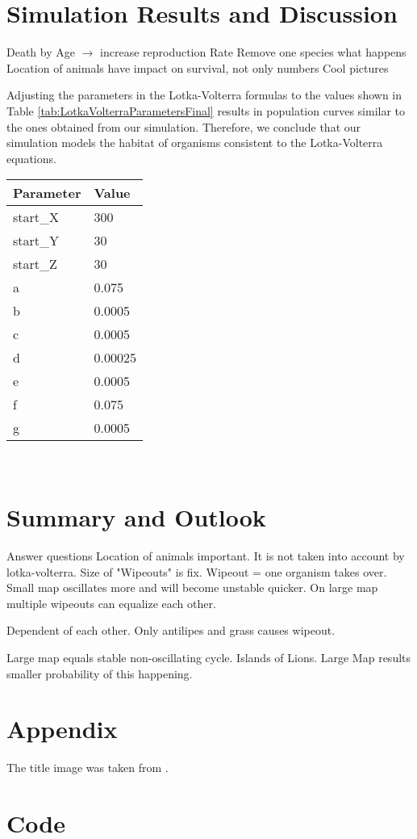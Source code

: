 \documentclass[11pt]{article}
\begin{document}

\section{Simulation Results and Discussion}
Death by Age $\rightarrow$ increase reproduction Rate
Remove one species what happens
Location of animals have impact on survival, not only numbers
Cool pictures

Adjusting the parameters in the Lotka-Volterra formulas to the values shown in Table \ref{tab:LotkaVolterraParametersFinal} results in  population curves similar to the ones obtained from our simulation. Therefore, we conclude that our simulation models the habitat of organisms consistent to the Lotka-Volterra equations. 
\\
\begin{tabular}{l|l}\label{tab:LotkaVolterraParametersFinal}
Parameter & Value \\ 
\hline 
\hline
start\_X & 300\\
\hline
start\_Y & 30\\
\hline
start\_Z & 30\\
\hline
a & 0.075\\ 
\hline 
b & 0.0005\\ 
\hline 
c & 0.0005\\  
\hline 
d & 0.00025\\
\hline 
e & 0.0005\\
\hline 
f & 0.075\\
\hline 
g & 0.0005\\
\end{tabular} \\

\section{Summary and Outlook}
Answer questions
Location of animals important. It is not taken into account by lotka-volterra.
Size of "Wipeouts" is fix. Wipeout = one organism takes over. Small map oscillates more and will become unstable quicker. On large map multiple wipeouts can equalize each other.

Dependent of each other. 
Only antilipes and grass causes wipeout.

Large map equals stable non-oscillating cycle. 
Islands of Lions. Large Map results smaller probability of this happening. 


\appendix

\section{Appendix}
The title image was taken from \cite{titleImage}.

\section{Code}



\end{document}

